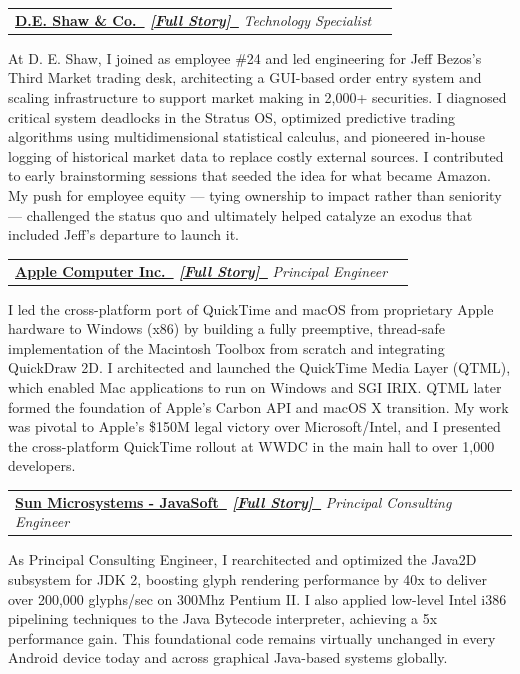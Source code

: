 \documentclass[letterpaper,11pt]{article}
\makeatletter
\newcommand{\faExternalLink}{\faIcon{external-link-alt}}
\renewcommand{\faExternalLink}{\faIcon{external-link-alt}}
\newcommand{\resumeItem}[1]{
    \item\small{
            {#1 \vspace{-2pt}}
    }
}
\newcommand{\resumeSubheading}[4]{
    \vspace{-2pt}\item
    \begin{tabular*}{1.0\textwidth}[t]{l@{\extracolsep{\fill}}r}
    \textbf{#1}  \textit{\small#3} & \textbf{\small #2} \\
    \end{tabular*}\vspace{-7pt}
}
\newcommand{\linkglyph}{{\LinkFont\symbol{"1F517}}}
\makeatother
\begin{document}
    \resumeSubheading
    {\href{https://www.deshaw.com}{D.E. Shaw \& Co.~\faExternalLink}
    \quad\small
    \textit
    {\href {https://paul-charlton.vercel.app/story/25}{[Full Story]~{\linkglyph}}}
    }
    {}
    {Technology Specialist}
    {New York, NY}
    \resumeItem{
        At D. E. Shaw, I joined as employee \#24 and led engineering for Jeff Bezos’s Third Market trading desk, architecting a GUI-based order entry system and scaling infrastructure to support market making in 2,000+ securities. I diagnosed critical system deadlocks in the Stratus OS, optimized predictive trading algorithms using multidimensional statistical calculus, and pioneered in-house logging of historical market data to replace costly external sources. I contributed to early brainstorming sessions that seeded the idea for what became Amazon. My push for employee equity — tying ownership to impact rather than seniority — challenged the status quo and ultimately helped catalyze an exodus that included Jeff’s departure to launch it.
    }

    \resumeSubheading
    {\href{https://www.apple.com}{Apple Computer Inc.~\faExternalLink}
    \quad\small
    \textit
    {\href{https://paul-charlton.vercel.app/story/11}{[Full Story]~{\linkglyph}}}
    }
    {}
    {Principal Engineer}
    {Cupertino, CA}
    \resumeItem{
        I led the cross-platform port of QuickTime and macOS from proprietary Apple hardware to Windows (x86) by building a fully preemptive, thread-safe implementation of the Macintosh Toolbox from scratch and integrating QuickDraw 2D. I architected and launched the QuickTime Media Layer (QTML), which enabled Mac applications to run on Windows and SGI IRIX. QTML later formed the foundation of Apple’s Carbon API and macOS X transition. My work was pivotal to Apple’s \$150M legal victory over Microsoft/Intel, and I presented the cross-platform QuickTime rollout at WWDC in the main hall to over 1,000 developers.
    }

    \resumeSubheading
    {\href{https://www.oracle.com/sun}{Sun Microsystems - JavaSoft~\faExternalLink}
    \quad\small
    \textit{
        \href{https://paul-charlton.vercel.app/story/5}{[Full Story]~{\linkglyph}}}
    }
    {}
    {Principal Consulting Engineer}
    {Palo Alto, CA}
    \resumeItem{
        As Principal Consulting Engineer, I rearchitected and optimized the Java2D subsystem for JDK 2, boosting glyph rendering performance by 40x to deliver over 200,000 glyphs/sec on 300Mhz Pentium II. I also applied low-level Intel i386 pipelining techniques to the Java Bytecode interpreter, achieving a 5x performance gain. This foundational code remains virtually unchanged in every Android device today and across graphical Java-based systems globally.
    }
\end{document}
